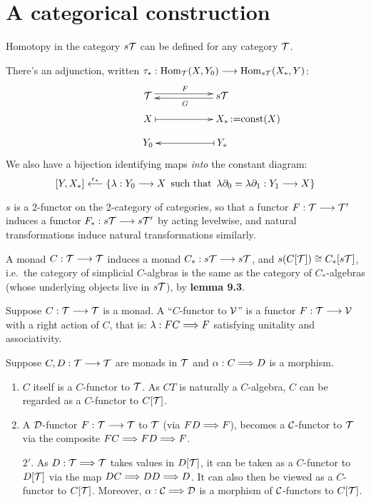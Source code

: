 \documentclass[11pt]{article}
\begin{document}
\section{A categorical construction}
\begin{itemise}
\item Homotopy in the category $s\mathcal{T}$ can be defined for any category $\mathcal{T}$.
\item There's an adjunction, written $\tau_*:\operatorname{Hom}_{\mathcal{T}}(X,Y_0)\longrightarrow\operatorname{Hom}_{s\mathcal{T}}(X_*,Y)$:
\[\xymatrix@R=.3cm@C=2cm{
\calT  \ar@<.6ex>[r]^{F}&
s\calT  \ar@<.4ex>[l]^{G}\\
X \ar@{|->}[r] & X_*\makebox[0cm][l]{\,:=$\textup{const}(X)$}\\
Y_0             & Y_* \ar@{|->}[l]\\
}\]
We also have a bijection identifying maps \emph{into} the constant diagram:
\[[Y,X_*]\overset{\epsilon_*}{\longleftarrow}\left\{\lambda:Y_0\longrightarrow X\,\textup{\ such that\ }\,
\lambda\partial_0=\lambda\partial_1:Y_1\longrightarrow X\right\}\]
\item $s$ is a 2-functor on the 2-category of categories, so that a functor $F:\mathcal{T}\longrightarrow\mathcal{T}'$ induces a functor $F_*:s\mathcal{T}\longrightarrow s\mathcal{T}'$ by acting levelwise, and natural transformations induce natural transformations similarly.
\item A monad $C:\mathcal{T}\longrightarrow\mathcal{T}$ induces a monad $C_*:s\mathcal{T}\longrightarrow s\mathcal{T}$, and $s(C[\mathcal{T}])\cong C_*[s\mathcal{T}]$, i.e.\ the category of simplicial $C$-algbras is the same as the category of $C_*$-algebras (whose underlying objects live in $s\mathcal{T}$), by \textbf{lemma 9.3}.
\item Suppose $C:\mathcal{T}\longrightarrow\mathcal{T}$ is a monad. A ``$C$-functor to $\mathcal{V}$'' is a functor $F:\mathcal{T}\longrightarrow \mathcal{V}$ with a right action of $C$, that is: $\lambda:FC\Longrightarrow F$ satisfying unitality and associativity.
\begin{exmps*}[9.5]
Suppose $C,D:\mathcal{T}\longrightarrow\mathcal{T}$ are monads in $\mathcal{T}$ and  $\alpha:C\Longrightarrow D$ is a morphism.
\begin{enumerate}\squishlist
\item $C$ itself is a $C$-functor to $\mathcal{T}$. As $CT$ is naturally a $C$-algebra, $C$ can be regarded as a $C$-functor to $C[\mathcal{T}]$.
\item %
A $\mathcal{D}$-functor $F:\mathcal{T}\longrightarrow\mathcal{T}$ to $\mathcal{T}$ (via $FD\Longrightarrow F$), becomes a $\mathcal{C}$-functor to $\mathcal{T}$ via the composite $FC\Longrightarrow FD\Longrightarrow F$.
\item[$2'$.] As $D:\mathcal{T}\Longrightarrow \mathcal{T}$ takes values in $D[\mathcal{T}]$, it can be taken as a $C$-functor to $D[\mathcal{T}]$ via the map $DC\Longrightarrow DD\Longrightarrow D$. It can also then be viewed as a $C$-functor to $C[\mathcal{T}]$. Moreover, $\alpha:\mathcal{C}\Longrightarrow\mathcal{D}$ is a morphism of $\mathcal{C}$-functors to $C[\mathcal{T}]$.

\end{enumerate}
\end{exmps*}
\end{itemise}
\end{document}

